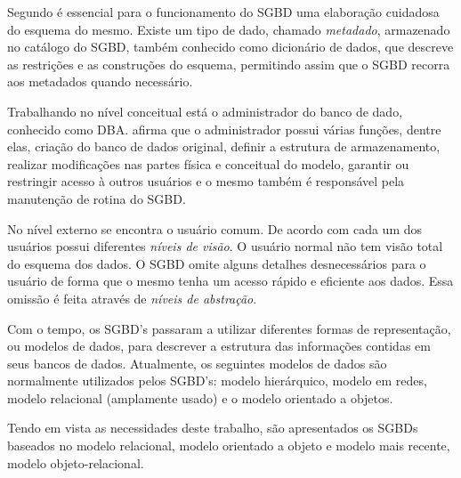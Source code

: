 Segundo  é essencial para o funcionamento do SGBD uma elaboração cuidadosa do esquema do mesmo. Existe um tipo de dado, chamado \textit{metadado}, armazenado no catálogo do SGBD, também conhecido como dicionário de dados, que descreve as restrições e as construções do esquema, permitindo assim que o SGBD recorra aos metadados quando necessário.   

Trabalhando no nível conceitual está o administrador do banco de dado, conhecido como DBA.  afirma que o administrador possui várias funções, dentre elas, criação do banco de dados original, definir a estrutura de armazenamento, realizar modificações nas partes física e conceitual do modelo, garantir ou restringir acesso à outros usuários e o mesmo também é responsável pela manutenção de rotina do SGBD.%

No nível externo se encontra o usuário comum. De acordo com  cada um dos usuários possui diferentes \textit{níveis de visão}. O usuário normal não tem visão total do esquema dos dados. O SGBD omite alguns detalhes desnecessários para o usuário de forma que o mesmo tenha um acesso rápido e eficiente aos dados. Essa omissão é feita através de \textit{níveis de abstração}.

\begin{citacao}
    Com o tempo, os SGBD’s passaram a utilizar diferentes formas de representação, ou modelos de dados, para descrever a estrutura das informações contidas em seus bancos de dados. Atualmente, os seguintes modelos de dados são normalmente utilizados pelos SGBD’s: modelo hierárquico, modelo em redes, modelo relacional (amplamente usado) e o modelo orientado a objetos. \cite[p.6]{takai2005intro}
\end{citacao}

Tendo em vista as necessidades deste trabalho, são apresentados os SGBDs baseados no modelo relacional, modelo orientado a objeto e modelo mais recente, modelo objeto-relacional. 

